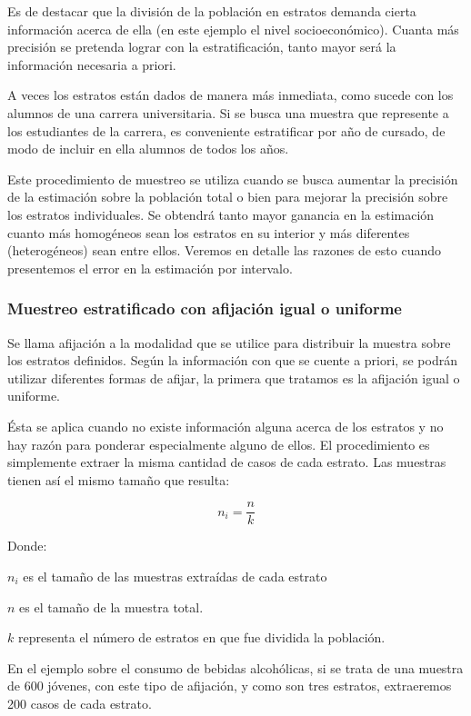 \documentclass[]{book}
\begin{document}
Es de destacar que la división de la población en estratos demanda
cierta información acerca de ella (en este ejemplo el nivel
socioeconómico). Cuanta más precisión se pretenda lograr con la
estratificación, tanto mayor será la información necesaria a priori.

A veces los estratos están dados de manera más inmediata, como sucede
con los alumnos de una carrera universitaria. Si se busca una muestra
que represente a los estudiantes de la carrera, es conveniente
estratificar por año de cursado, de modo de incluir en ella alumnos de
todos los años.

Este procedimiento de muestreo se utiliza cuando se busca aumentar la
precisión de la estimación sobre la población total o bien para mejorar
la precisión sobre los estratos individuales. Se obtendrá tanto mayor
ganancia en la estimación cuanto más homogéneos sean los estratos en su
interior y más diferentes (heterogéneos) sean entre ellos. Veremos en
detalle las razones de esto cuando presentemos el error en la estimación
por intervalo.

\hypertarget{muestreo-estratificado-con-afijacion-igual-o-uniforme}{%
\subsubsection{Muestreo estratificado con afijación igual o uniforme}\label{muestreo-estratificado-con-afijacion-igual-o-uniforme}}

Se llama afijación a la modalidad que se utilice para distribuir la
muestra sobre los estratos definidos. Según la información con que se
cuente a priori, se podrán utilizar diferentes formas de afijar, la
primera que tratamos es la afijación igual o uniforme.

Ésta se aplica cuando no existe información alguna acerca de los
estratos y no hay razón para ponderar especialmente alguno de ellos. El
procedimiento es simplemente extraer la misma cantidad de casos de cada
estrato. Las muestras tienen así el mismo tamaño que resulta:

\[n_{i} = \frac{n}{k}\]

Donde:

\(n_{i}\) es el tamaño de las muestras extraídas de cada estrato

\(n\) es el tamaño de la muestra total.

\(k\) representa el número de estratos en que fue dividida la población.

En el ejemplo sobre el consumo de bebidas alcohólicas, si se trata de
una muestra de 600 jóvenes, con este tipo de afijación, y como son tres
estratos, extraeremos 200 casos de cada estrato.
\end{document}
